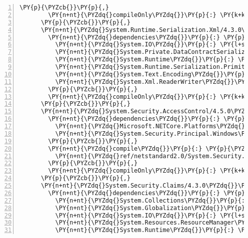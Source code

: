 \begin{Verbatim}[commandchars=\\\{\},numbers=left,firstnumber=1,stepnumber=1,numberblanklines=0]
        \PY{p}{\PYZcb{}}\PY{p}{,}
        \PY{n+nt}{\PYZdq{}compileOnly\PYZdq{}}\PY{p}{:} \PY{k+kc}{true}
      \PY{p}{\PYZcb{}}\PY{p}{,}
      \PY{n+nt}{\PYZdq{}System.Runtime.Serialization.Xml/4.3.0\PYZdq{}}\PY{p}{:} \PY{p}{\PYZob{}}
        \PY{n+nt}{\PYZdq{}dependencies\PYZdq{}}\PY{p}{:} \PY{p}{\PYZob{}}
          \PY{n+nt}{\PYZdq{}System.IO\PYZdq{}}\PY{p}{:} \PY{l+s+s2}{\PYZdq{}4.3.0\PYZdq{}}\PY{p}{,}
          \PY{n+nt}{\PYZdq{}System.Private.DataContractSerialization\PYZdq{}}\PY{p}{:} \PY{l+s+s2}{\PYZdq{}4.3.0\PYZdq{}}\PY{p}{,}
          \PY{n+nt}{\PYZdq{}System.Runtime\PYZdq{}}\PY{p}{:} \PY{l+s+s2}{\PYZdq{}4.3.0\PYZdq{}}\PY{p}{,}
          \PY{n+nt}{\PYZdq{}System.Runtime.Serialization.Primitives\PYZdq{}}\PY{p}{:} \PY{l+s+s2}{\PYZdq{}4.3.0\PYZdq{}}\PY{p}{,}
          \PY{n+nt}{\PYZdq{}System.Text.Encoding\PYZdq{}}\PY{p}{:} \PY{l+s+s2}{\PYZdq{}4.3.0\PYZdq{}}\PY{p}{,}
          \PY{n+nt}{\PYZdq{}System.Xml.ReaderWriter\PYZdq{}}\PY{p}{:} \PY{l+s+s2}{\PYZdq{}4.3.0\PYZdq{}}
        \PY{p}{\PYZcb{}}\PY{p}{,}
        \PY{n+nt}{\PYZdq{}compileOnly\PYZdq{}}\PY{p}{:} \PY{k+kc}{true}
      \PY{p}{\PYZcb{}}\PY{p}{,}
      \PY{n+nt}{\PYZdq{}System.Security.AccessControl/4.5.0\PYZhy{}rc1\PYZdq{}}\PY{p}{:} \PY{p}{\PYZob{}}
        \PY{n+nt}{\PYZdq{}dependencies\PYZdq{}}\PY{p}{:} \PY{p}{\PYZob{}}
          \PY{n+nt}{\PYZdq{}Microsoft.NETCore.Platforms\PYZdq{}}\PY{p}{:} \PY{l+s+s2}{\PYZdq{}2.1.0\PYZhy{}rc1\PYZdq{}}\PY{p}{,}
          \PY{n+nt}{\PYZdq{}System.Security.Principal.Windows\PYZdq{}}\PY{p}{:} \PY{l+s+s2}{\PYZdq{}4.5.0\PYZhy{}rc1\PYZdq{}}
        \PY{p}{\PYZcb{}}\PY{p}{,}
        \PY{n+nt}{\PYZdq{}compile\PYZdq{}}\PY{p}{:} \PY{p}{\PYZob{}}
          \PY{n+nt}{\PYZdq{}ref/netstandard2.0/System.Security.AccessControl.dll\PYZdq{}}\PY{p}{:} \PY{p}{\PYZob{}}\PY{p}{\PYZcb{}}
        \PY{p}{\PYZcb{}}\PY{p}{,}
        \PY{n+nt}{\PYZdq{}compileOnly\PYZdq{}}\PY{p}{:} \PY{k+kc}{true}
      \PY{p}{\PYZcb{}}\PY{p}{,}
      \PY{n+nt}{\PYZdq{}System.Security.Claims/4.3.0\PYZdq{}}\PY{p}{:} \PY{p}{\PYZob{}}
        \PY{n+nt}{\PYZdq{}dependencies\PYZdq{}}\PY{p}{:} \PY{p}{\PYZob{}}
          \PY{n+nt}{\PYZdq{}System.Collections\PYZdq{}}\PY{p}{:} \PY{l+s+s2}{\PYZdq{}4.3.0\PYZdq{}}\PY{p}{,}
          \PY{n+nt}{\PYZdq{}System.Globalization\PYZdq{}}\PY{p}{:} \PY{l+s+s2}{\PYZdq{}4.3.0\PYZdq{}}\PY{p}{,}
          \PY{n+nt}{\PYZdq{}System.IO\PYZdq{}}\PY{p}{:} \PY{l+s+s2}{\PYZdq{}4.3.0\PYZdq{}}\PY{p}{,}
          \PY{n+nt}{\PYZdq{}System.Resources.ResourceManager\PYZdq{}}\PY{p}{:} \PY{l+s+s2}{\PYZdq{}4.3.0\PYZdq{}}\PY{p}{,}
          \PY{n+nt}{\PYZdq{}System.Runtime\PYZdq{}}\PY{p}{:} \PY{l+s+s2}{\PYZdq{}4.3.0\PYZdq{}}\PY{p}{,}

\end{Verbatim}
